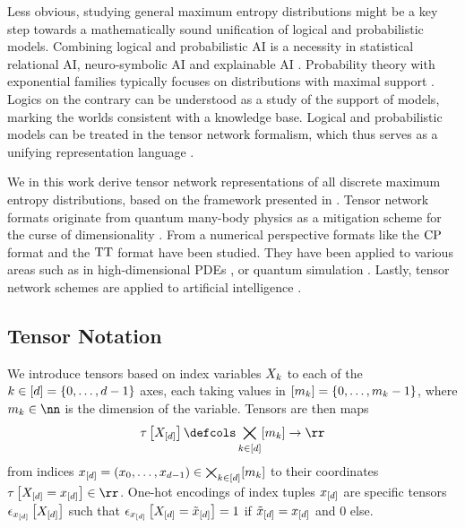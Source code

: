 Less obvious, studying general maximum entropy distributions might be a key step towards a mathematically sound unification of logical and probabilistic models.
Combining logical and probabilistic AI is a necessity in statistical relational AI, neuro-symbolic AI and explainable AI \cite{de_raedt_probabilistic_2008,getoor_introduction_2019,sarker_neuro-symbolic_2022}.
Probability theory with exponential families typically focuses on distributions with maximal support \cite{koller_probabilistic_2009}. %
Logics on the contrary can be understood as a study of the support of models, marking the worlds consistent with a knowledge base.
Logical and probabilistic models can be treated in the tensor network formalism, which thus serves as a unifying representation language \cite{goessmann_tensor_2026}.

We in this work derive tensor network representations of all discrete maximum entropy distributions, based on the framework presented in \cite{goessmann_tensor-network_2025,goessmann_tensor_2026}.
Tensor network formats originate from quantum many-body physics \cite{white_density-matrix_1993} as a mitigation scheme for the curse of dimensionality \cite{bellman_adaptive_1961}.
From a numerical perspective \cite{hackbusch_new_2009,hackbusch_tensor_2012} formats like the $\mathrm{CP}$ format \cite{hitchcock_expression_1927,beylkin_algorithms_2005} and the $\mathrm{TT}$ format \cite{oseledets_tensor-train_2011} have been studied.
They have been applied to various areas such as in high-dimensional PDEs \cite{eigel_variational_2019,eigel_adaptive_2020}, or quantum simulation \cite{sander_quantum_2025}.
Lastly, tensor network schemes are applied to artificial intelligence \cite{badreddine_logic_2022,domingos_tensor_2025,ali_explicit_2025}.

\subsection{Tensor Notation}

We introduce tensors based on index variables $X_{k}$ to each of the $k\in[d]=\{0,\ldots,d-1\}$ axes, each taking values in $[m_{k}]=\{0,\ldots,m_{k}-1\}$, where $\catdimof{\catenumerator}\in\nn$ is the dimension of the variable.
Tensors are then maps
\begin{align*}
    \hypercorewith \defcols \facstates \rightarrow \rr
\end{align*}
from indices $x_{[d]}=(x_{0},\ldots,x_{d-1})\in\bigtimes_{k\in[d]}[m_{k}]$ to their coordinates $\hypercoreat{\indexedshortcatvariables}\in\rr$.
One-hot encodings of index tuples $x_{[d]}$ are specific tensors $\epsilon_{x_{[d]}}\left[X_{[d]}\right]$ such that $\epsilon_{x_{[d]}}\left[X_{[d]}=\tilde{x}_{[d]}\right]=1$ if $\tilde{x}_{[d]}=x_{[d]}$ and $0$ else.


